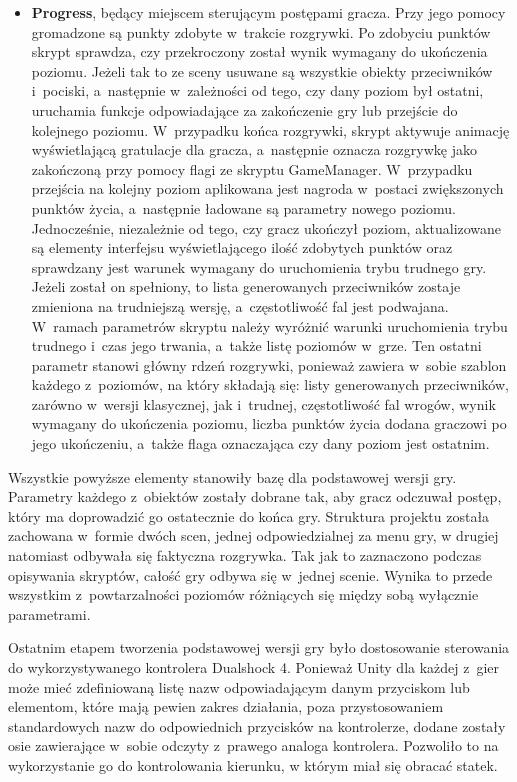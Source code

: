 \begin{itemize}
	\item \textbf{Progress}, będący miejscem sterującym postępami gracza. Przy jego pomocy gromadzone są punkty zdobyte w~trakcie rozgrywki. Po zdobyciu punktów skrypt sprawdza, czy przekroczony został wynik wymagany do ukończenia poziomu. Jeżeli tak to  ze sceny usuwane są wszystkie obiekty przeciwników i~pociski, a~następnie w~zależności od tego, czy dany poziom był ostatni, uruchamia funkcje odpowiadające za zakończenie gry lub przejście do kolejnego poziomu. W~przypadku końca rozgrywki, skrypt aktywuje animację wyświetlającą gratulacje dla gracza, a~następnie oznacza rozgrywkę jako zakończoną przy pomocy flagi ze skryptu GameManager. W~przypadku przejścia na kolejny poziom aplikowana jest nagroda w~postaci zwiększonych punktów życia, a~następnie ładowane są parametry nowego poziomu. Jednocześnie, niezależnie od tego, czy gracz ukończył poziom, aktualizowane są elementy interfejsu wyświetlającego ilość zdobytych punktów oraz sprawdzany jest warunek wymagany do uruchomienia trybu trudnego gry. Jeżeli został on spełniony, to lista generowanych przeciwników zostaje zmieniona na trudniejszą wersję, a~częstotliwość fal jest podwajana. W~ramach parametrów skryptu należy wyróżnić warunki uruchomienia trybu trudnego i~czas jego trwania, a~także listę poziomów w~grze. Ten ostatni parametr stanowi główny rdzeń rozgrywki, ponieważ zawiera w~sobie szablon każdego z~poziomów, na który składają się: listy generowanych przeciwników, zarówno w~wersji klasycznej, jak i~trudnej, częstotliwość fal wrogów, wynik wymagany do ukończenia poziomu, liczba punktów życia dodana graczowi po jego ukończeniu, a~także flaga oznaczająca czy dany poziom jest ostatnim.
\end{itemize}

Wszystkie powyższe elementy stanowiły bazę dla podstawowej wersji gry. Parametry każdego z~obiektów zostały dobrane tak, aby gracz odczuwał postęp, który ma doprowadzić go ostatecznie do końca gry. Struktura projektu została zachowana w~formie dwóch scen, jednej odpowiedzialnej za menu gry, w drugiej natomiast odbywała się faktyczna rozgrywka. Tak jak to zaznaczono podczas opisywania skryptów, całość gry odbywa się w~jednej scenie. Wynika to przede wszystkim z~powtarzalności poziomów różniących się między sobą wyłącznie parametrami. 

Ostatnim etapem tworzenia podstawowej wersji gry było dostosowanie sterowania do wykorzystywanego kontrolera Dualshock 4. Ponieważ Unity dla każdej z~gier może mieć zdefiniowaną listę nazw odpowiadającym danym przyciskom lub elementom, które mają pewien zakres działania, poza przystosowaniem standardowych nazw do odpowiednich przycisków na kontrolerze, dodane zostały osie zawierające w~sobie odczyty z~prawego analoga kontrolera. Pozwoliło to na wykorzystanie go do kontrolowania kierunku, w którym miał się obracać statek.

